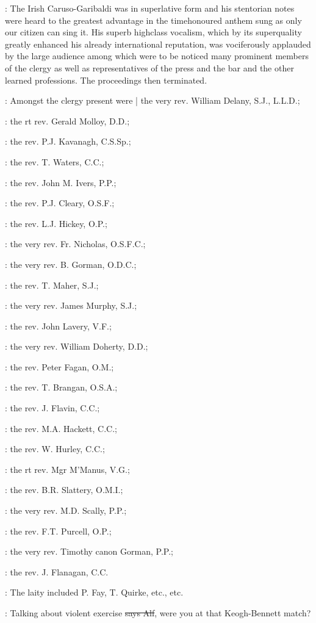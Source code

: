 :
The Irish Caruso-Garibaldi
was in superlative form
and his stentorian notes were heard to the
greatest advantage in the timehonoured anthem sung as only our citizen
can sing it.
His superb highclass vocalism,
which by its superquality
greatly enhanced his already international reputation,
was vociferously
applauded by the large audience among which were to be noticed many
prominent members of the clergy as well as representatives of the press
and the bar and the other learned professions.
The proceedings then terminated.

:
Amongst the clergy present were |
the very rev. William Delany, S.J., L.L.D.;

:
the rt rev. Gerald Molloy, D.D.;

:
the rev. P.J. Kavanagh, C.S.Sp.;

:
the rev. T. Waters, C.C.;


:
the rev. John M. Ivers, P.P.;

:
the rev. P.J. Cleary, O.S.F.;

:
the rev. L.J. Hickey, O.P.;


:
the very rev. Fr. Nicholas, O.S.F.C.;


:
the very rev. B. Gorman, O.D.C.;

:
the rev. T. Maher, S.J.;

:
the very rev. James Murphy, S.J.;

:
the rev. John Lavery, V.F.;

:
the very rev. William Doherty, D.D.;

:
the rev. Peter Fagan, O.M.;

:
the rev. T. Brangan, O.S.A.;

:
the rev. J. Flavin, C.C.;

:
the rev. M.A. Hackett, C.C.;

:
the rev. W. Hurley, C.C.;

:
the rt rev. Mgr M'Manus, V.G.;

:
the rev. B.R. Slattery, O.M.I.;

:
the very rev. M.D. Scally, P.P.;

:
the rev. F.T. Purcell, O.P.;

:
the very rev. Timothy canon Gorman, P.P.;

:
the rev. J. Flanagan, C.C.

:
The laity included P. Fay,
T. Quirke,
etc.,
etc.

\bergan:
Talking about violent exercise
\sout{says Alf},
were you at that Keogh-Bennett match?

